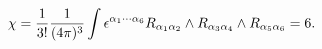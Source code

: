 \begin{equation}
\chi={1\over 3!}{1\over (4\pi)^3} 
\int \epsilon^{\alpha_1\cdots\alpha_6} R_{\alpha_1\alpha_2}\wedge
R_{\alpha_3\alpha_4}\wedge R_{\alpha_5\alpha_6}=6.
\end{equation}

